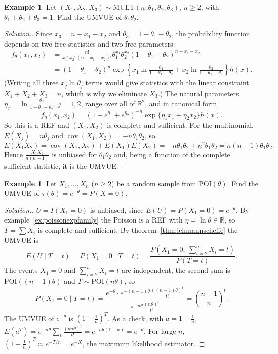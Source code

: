 \documentclass[12pt,a4paper]{report}
\theoremstyle{definition}
\newtheorem{exa}[thm]{Example}
\DeclareMathOperator{\cov}{cov}
\newenvironment{solution}
  {\renewcommand{\qedsymbol}{}\begin{proof}[\textit{Solution}.]}
  {\end{proof}}
\begin{document}
\begin{exa}
\label{ex:multinomialumvue}
Let $(X_1, X_2, X_3)\sim\text{MULT}(n; \theta_1, \theta_2, \theta_3)$, $n\ge 2$,
with $\theta_1 + \theta_2 + \theta_3 = 1$. Find the UMVUE of $\theta_1\theta_2$.
\end{exa}

\begin{solution}
Since $x_3 = n - x_1 - x_2$ and $\theta_3 = 1 - \theta_1 - \theta_2$, the
probability function depends on two free statistics and two free parameters:
\begin{align*}
f_\theta(x_1, x_2) &= \frac{n!}{x_1!\,x_2!\,(n - x_1 - x_2)!}\theta_1^{x_1}\theta_2^{x_2}(1 - \theta_1 - \theta_2)^{n - x_1 - x_2}\\
&= (1 - \theta_1 - \theta_2)^n\exp\left\{x_1\ln\frac{\theta_1}{1 - \theta_1 - \theta_2} + x_2\ln\frac{\theta_2}{1 - \theta_1 - \theta_2}\right\}h(x).
\end{align*}
(Writing all three $x_j\ln\theta_j$ terms would give statistics with the linear
constraint $X_1 + X_2 + X_3 = n$, which is why we eliminate $X_3$.) The natural
parameters $\eta_j = \ln\frac{\theta_j}{1 - \theta_1 - \theta_2}$, $j = 1, 2$,
range over all of $\mathbb{R}^2$, and in canonical form
\[f_\eta(x_1, x_2) = \left(1 + e^{\eta_1} + e^{\eta_2}\right)^{-n}\exp\{\eta_1x_1 + \eta_2x_2\}h(x).\]
So this is a REF and $(X_1, X_2)$ is complete and sufficient. For the multinomial,
$E(X_j) = n\theta_j$ and $\cov(X_1, X_2) = -n\theta_1\theta_2$, so
\[E(X_1X_2) = \cov(X_1, X_2) + E(X_1)E(X_2) = -n\theta_1\theta_2 + n^2\theta_1\theta_2 = n(n - 1)\theta_1\theta_2 .\]
Hence $\frac{X_1X_2}{n(n - 1)}$ is unbiased for $\theta_1\theta_2$ and, being a function
of the complete sufficient statistic, it is the UMVUE.
\end{solution}

\begin{exa}
\label{ex:poissonzero}
Let $X_1, \dots, X_n$ ($n\ge 2$) be a random sample from $\text{POI}(\theta)$. Find
the UMVUE of $\tau(\theta) = e^{-\theta} = P(X = 0)$.
\end{exa}

\begin{solution}
$U = I(X_1 = 0)$ is unbiased, since $E(U) = P(X_1 = 0) = e^{-\theta}$. By
example~\ref{ex:poissonexpfamily} the Poisson is a REF with $\eta = \ln\theta\in\mathbb{R}$,
so $T = \sum X_i$ is complete and sufficient. By theorem~\ref{thm:lehmannscheffe}
the UMVUE is
\[E(U\mid T = t) = P(X_1 = 0\mid T = t) = \frac{P\left(X_1 = 0,\ \sum_{i=2}^n X_i = t\right)}{P(T = t)} .\]
The events $X_1 = 0$ and $\sum_{i=2}^n X_i = t$ are independent, the second sum is
$\text{POI}((n - 1)\theta)$ and $T\sim\text{POI}(n\theta)$, so
\[P(X_1 = 0\mid T = t) = \frac{e^{-\theta}\cdot e^{-(n - 1)\theta}\frac{((n - 1)\theta)^t}{t!}}{e^{-n\theta}\frac{(n\theta)^t}{t!}}
= \left(\frac{n - 1}{n}\right)^t .\]
The UMVUE of $e^{-\theta}$ is $\left(1 - \frac1n\right)^T$. As a check, with
$a = 1 - \frac1n$,
$E\left(a^T\right) = e^{-n\theta}\sum_t\frac{(an\theta)^t}{t!} = e^{-n\theta(1 - a)} = e^{-\theta}$.
For large $n$, $\left(1 - \frac1n\right)^T\approx e^{-T/n} = e^{-\bar X}$, the
maximum likelihood estimator.
\end{solution}
\end{document}
